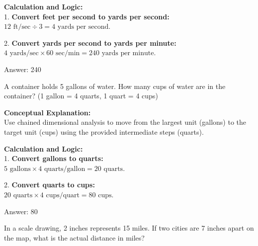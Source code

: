 \documentclass[11pt,paper=a4,answers]{exam}
\begin{document}
\begin{questions}
\begin{solution}
\textbf{Calculation and Logic:} \\
1. \textbf{Convert feet per second to yards per second:} \\
$12 \text{ ft/sec} \div 3 = 4 \text{ yards per second}$.

\vspace{15pt}

2. \textbf{Convert yards per second to yards per minute:} \\
$4 \text{ yards/sec} \times 60 \text{ sec/min} = 240 \text{ yards per minute}$.

\vspace{30pt}

Answer: \colorbox{yellow!100}{240}
\end{solution}

\vspace{60pt}

\question
A container holds 5 gallons of water. How many cups of water are in the container? (1 gallon = 4 quarts, 1 quart = 4 cups)

\begin{solution}
\textbf{Conceptual Explanation:} \\
Use chained dimensional analysis to move from the largest unit (gallons) to the target unit (cups) using the provided intermediate steps (quarts).

\vspace{30pt}

\textbf{Calculation and Logic:} \\
1. \textbf{Convert gallons to quarts:} \\
$5 \text{ gallons} \times 4 \text{ quarts/gallon} = 20 \text{ quarts}$.

\vspace{15pt}

2. \textbf{Convert quarts to cups:} \\
$20 \text{ quarts} \times 4 \text{ cups/quart} = 80 \text{ cups}$.

\vspace{30pt}

Answer: \colorbox{yellow!100}{80}
\end{solution}

\vspace{60pt}

\question
In a scale drawing, 2 inches represents 15 miles. If two cities are 7 inches apart on the map, what is the actual distance in miles?


\end{questions}
\end{document}
